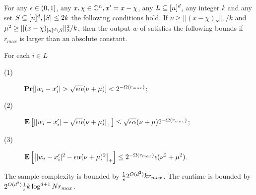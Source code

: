 \begin{lemma}\label{lm:estimate-l1l2}
For any ${\epsilon}\in (0, 1]$, any $x, \chi\in \mathbb{C}^n, x'=x-\chi$, any $L\subseteq {[n]^d}$, any integer $k$ and any set $S\subseteq {[n]^d}, |S|\leq 2k$ the following conditions hold. If $\nu\geq ||(x-\chi)_S||_1/k$ and $\mu^2\geq ||(x-\chi)_{{[n]^d}\setminus S}||_2^2/k$, then the output $w$ of  satisfies the following bounds if $r_{max}$ is larger than an absolute constant.

For each $i\in L$ 
\begin{description}
\item[(1)] $\prob[|w_i- x'_i|>\sqrt{\e \alpha}(\nu+\mu)]<2^{-\Omega(r_{max})}$;
\item[(2)] ${\bf \mbox{\bf E}}\left[\left||w_i- x'_i|-\sqrt{{\epsilon} \alpha}(\nu+\mu)\right|_+\right]\leq \sqrt{{\epsilon}\alpha}(\nu+\mu)2^{-\Omega(r_{max})}$;
\item[(3)] ${\bf \mbox{\bf E}}\left[\left||w_i-x'_i|^2-{\epsilon} \alpha(\nu+\mu)^2\right|_+\right]\leq 2^{-\Omega(r_{max})}{\epsilon}(\nu^2+\mu^2)$.
\end{description}
The sample complexity is bounded by $\frac1{{\epsilon}}2^{O(d^2)} k r_{max}$. The runtime is bounded by $2^{O(d^2)}\frac1{{\epsilon}}k \log^{d+1} N r_{max}$.
\end{lemma}
